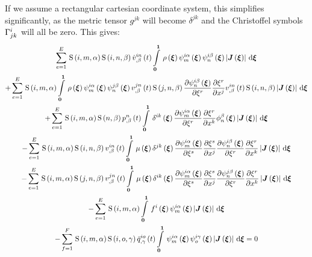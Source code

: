 If we assume a rectangular cartesian coordinate system, this simplifies
significantly, as the metric tensor $g^{jk}$ will become $\delta^{jk}$ and the
Christoffel symbols $ \Gamma^{i}_{jk} $ will all be zero. This gives:
\begin{multline}
  \gsum{e=1}{E}{\idxgsf{i}{m}{\alpha}\idxgsf{i}{n}{\beta}\fnof{\idxnodedof{\dot{v}}{i}{n}{\beta}}{t}
    \gint{\vectr{0}}{\vectr{1}}{\fnof{\rho}{\vectr{\xi}}
      \idxgbfn{i}{m}{\alpha}{\vectr{\xi}}\idxgbfn{i}{n}{\beta}{\vectr{\xi}}
      \abs{\fnof{\matr{J}}{\vectr{\xi}}}}{\vectr{\xi}}}\\
  +\gsum{e=1}{E}{\idxgsf{i}{m}{\alpha}\gint{\vectr{0}}{\vectr{1}}{\fnof{\rho}{\vectr{\xi}}
      \idxgbfn{i}{m}{\alpha}{\vectr{\xi}}\idxgbfn{j}{n}{\beta}{\vectr{\xi}}
      \fnof{\idxnodedof{v}{j}{n}{\beta}}{t}\idxgsf{j}{n}{\beta}\delby{\idxgbfn{i}{n}{\beta}{\vectr{\xi}}}{\xi^{r}}
      \delby{\xi^{r}}{x^{j}}\fnof{\idxnodedof{v}{i}{n}{\beta}}{t}\idxgsf{i}{n}{\beta}
      \abs{\fnof{\matr{J}}{\vectr{\xi}}}}{\vectr{\xi}}}\\
  +\gsum{e=1}{E}{\idxgsf{i}{m}{\alpha}\gsf{n}{\beta}\fnof{\nodedof{p}{n}{\beta}}{t}\gint{\vectr{0}}{\vectr{1}}{
      \fnof{\delta^{ik}}{\vectr{\xi}}\delby{\idxgbfn{i}{m}{\alpha}{\vectr{\xi}}}{\xi^{r}}\delby{\xi^{r}}{x^{k}}
      \altgbfn{n}{\beta}{\vectr{\xi}}\abs{\fnof{\matr{J}}{\vectr{\xi}}}}{\vectr{\xi}}}\\
  -\gsum{e=1}{E}{\idxgsf{i}{m}{\alpha}\idxgsf{i}{n}{\beta}\fnof{\idxnodedof{v}{i}{n}{\beta}}{t}\gint{\vectr{0}}{\vectr{1}}{
      \fnof{\mu}{\vectr{\xi}}\fnof{\delta^{jk}}{\vectr{\xi}}\delby{\idxgbfn{i}{m}{\alpha}{\vectr{\xi}}}{\xi^{s}}
      \delby{\xi^{s}}{x^{j}}\delby{\idxgbfn{i}{n}{\beta}{\vectr{\xi}}}{\xi^{r}}\delby{\xi^{r}}{x^{k}}
      \abs{\fnof{\matr{J}}{\vectr{\xi}}}}{\vectr{\xi}}}\\
  -\gsum{e=1}{E}{\idxgsf{i}{m}{\alpha}\idxgsf{j}{n}{\beta}\fnof{\idxnodedof{v}{j}{n}{\beta}}{t}
    \gint{\vectr{0}}{\vectr{1}}{\fnof{\mu}{\vectr{\xi}}\fnof{\delta^{ik}}{\vectr{\xi}}\delby{\idxgbfn{i}{m}{\alpha}{\vectr{\xi}}}{\xi^{s}}
      \delby{\xi^{s}}{x^{j}}\delby{\idxgbfn{j}{n}{\beta}{\vectr{\xi}}}{\xi^{r}}\delby{\xi^{r}}{x^{k}}
      \abs{\fnof{\matr{J}}{\vectr{\xi}}}}{\vectr{\xi}}} \\
  -\gsum{e=1}{E}{\idxgsf{i}{m}{\alpha}\gint{\vectr{0}}{\vectr{1}}{\fnof{f^{i}}{\vectr{\xi}}\idxgbfn{i}{m}{\alpha}{\vectr{\xi}}\abs{\fnof{\matr{J}}{\vectr{\xi}}}}{\vectr{\xi}}}\\
  -\gsum{f=1}{F}{\idxgsf{i}{m}{\alpha}\idxgsf{i}{o}{\gamma}\fnof{\idxnodedof{\bar{q}}{i}{o}{\gamma}}{t}
    \gint{\vectr{0}}{\vectr{1}}{\idxgbfn{i}{m}{\alpha}{\vectr{\xi}}\idxgbfn{i}{o}{\gamma}{\vectr{\xi}}
      \abs{\fnof{\matr{J}}{\vectr{\xi}}}}{\vectr{\xi}}}=0
  \label{eqn:NSEFEM5RC}
\end{multline}

